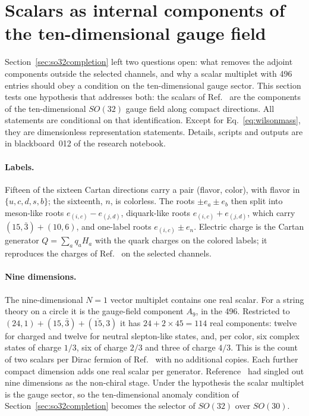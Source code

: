 \section{Scalars as internal components of the ten-dimensional gauge field}
\label{sec:gaugefieldscalars}
Section~\ref{sec:so32completion} left two questions open: what removes
the adjoint components outside the selected channels, and why a scalar
multiplet with 496 entries should obey a condition on the
ten-dimensional gauge sector. This section tests one hypothesis that
addresses both: the scalars of Ref.~\cite{Rivero2024} are the components
of the ten-dimensional $SO(32)$ gauge field along compact directions.
All statements are conditional on that identification. Except for
Eq.~\eqref{eq:wilsonmass}, they are dimensionless representation
statements. Details, scripts and outputs are in blackboard~012 of the
research notebook.

\paragraph{Labels.}
Fifteen of the sixteen Cartan directions carry a pair (flavor, color),
with flavor in $\{u,c,d,s,b\}$; the sixteenth, $n$, is colorless.
The roots $\pm e_a\pm e_b$ then split into meson-like roots
$e_{(i,c)}-e_{(j,d)}$, diquark-like roots $e_{(i,c)}+e_{(j,d)}$, which
carry $(15,\bar3)+(10,6)$, and one-label roots $e_{(i,c)}\pm e_n$.
Electric charge is the Cartan generator $Q=\sum_a q_aH_a$ with the quark
charges on the colored labels; it reproduces the charges of
Ref.~\cite{Rivero2024} on the selected channels.

\paragraph{Nine dimensions.}
The nine-dimensional $N=1$ vector multiplet contains one real scalar.
For a string theory on a circle it is the gauge-field component $A_9$,
in the 496. Restricted to $(24,1)+(15,\bar3)+(\overline{15},3)$ it has
$24+2\times45=114$ real components: twelve for charged and twelve for
neutral slepton-like states, and, per color, six complex states of
charge $1/3$, six of charge $2/3$ and three of charge $4/3$. This is the
count of two scalars per Dirac fermion of Ref.~\cite{Rivero2024} with no
additional copies. Each further compact dimension adds one real scalar
per generator. Reference~\cite{Rivero2009} had singled out nine
dimensions as the non-chiral stage. Under the hypothesis the scalar
multiplet is the gauge sector, so the ten-dimensional anomaly condition
of Section~\ref{sec:so32completion} becomes the selector of $SO(32)$
over $SO(30)$.

